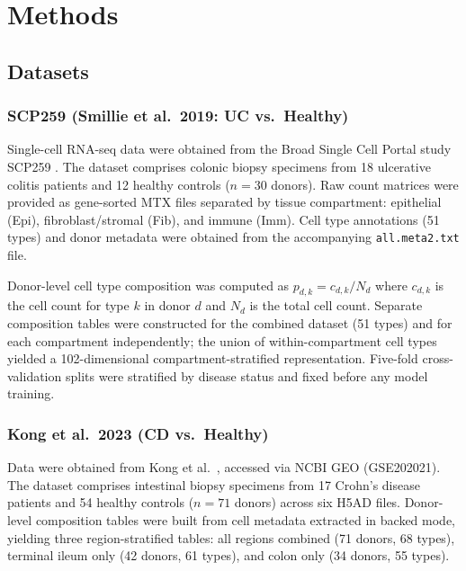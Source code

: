 \documentclass[11pt,letterpaper]{article}
\begin{document}
\section{Methods}

\subsection{Datasets}

\subsubsection{SCP259 (Smillie et al.\ 2019: UC vs.\ Healthy)}
Single-cell RNA-seq data were obtained from the Broad Single Cell Portal study
SCP259 \citep{smillie2019intra}. The dataset comprises colonic biopsy specimens
from 18 ulcerative colitis patients and 12 healthy controls ($n=30$ donors).
Raw count matrices were provided as gene-sorted MTX files separated by tissue
compartment: epithelial (Epi), fibroblast/stromal (Fib), and immune (Imm).
Cell type annotations (51 types) and donor metadata were obtained from the
accompanying \texttt{all.meta2.txt} file.

Donor-level cell type composition was computed as $p_{d,k} = c_{d,k} / N_d$
where $c_{d,k}$ is the cell count for type $k$ in donor $d$ and $N_d$ is the
total cell count. Separate composition tables were constructed for the combined
dataset (51 types) and for each compartment independently; the union of
within-compartment cell types yielded a 102-dimensional compartment-stratified
representation. Five-fold cross-validation splits were stratified by disease
status and fixed before any model training.

\subsubsection{Kong et al.\ 2023 (CD vs.\ Healthy)}
Data were obtained from Kong et al.\ \citep{kong2023single}, accessed via
NCBI GEO (GSE202021). The dataset comprises intestinal biopsy specimens from
17 Crohn's disease patients and 54 healthy controls ($n=71$ donors) across
six H5AD files. Donor-level composition tables were built from cell metadata
extracted in backed mode, yielding three region-stratified tables: all regions
combined (71 donors, 68 types), terminal ileum only (42 donors, 61 types), and
colon only (34 donors, 55 types).
\end{document}
